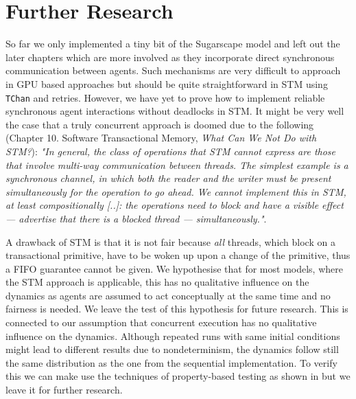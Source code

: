 \section{Further Research} %
\label{sec:further}

So far we only implemented a tiny bit of the Sugarscape model and left out the later chapters which are more involved as they incorporate direct synchronous communication between agents. Such mechanisms are very difficult to approach in GPU based approaches \cite{lysenko_framework_2008} but should be quite straightforward in STM using \texttt{TChan} and retries. However, we have yet to prove how to implement reliable synchronous agent interactions without deadlocks in STM. It might be very well the case that a truly concurrent approach is doomed due to the following \cite{marlow_parallel_2013} (Chapter 10. Software Transactional Memory, \textit{What Can We Not Do with STM?}): \textit{"In general, the class of operations that STM cannot express are those that involve multi-way communication between threads. The simplest example is a synchronous channel, in which both the reader and the writer must be present simultaneously for the operation to go ahead. We cannot implement this in STM, at least compositionally [..]: the operations need to block and have a visible effect — advertise that there is a blocked thread — simultaneously."}. 

A drawback of STM is that it is not fair because \textit{all} threads, which block on a transactional primitive, have to be woken up upon a change of the primitive, thus a FIFO guarantee cannot be given. We hypothesise that for most models, where the STM approach is applicable, this has no qualitative influence on the dynamics as agents are assumed to act conceptually at the same time and no fairness is needed. We leave the test of this hypothesis for future research. This is connected to our assumption that concurrent execution has no qualitative influence on the dynamics. Although repeated runs with same initial conditions might lead to different results due to nondeterminism, the dynamics follow still the same distribution as the one from the sequential implementation. To verify this we can make use the techniques of property-based testing as shown in \cite{thaler_show_2019} but we leave it for further research.
